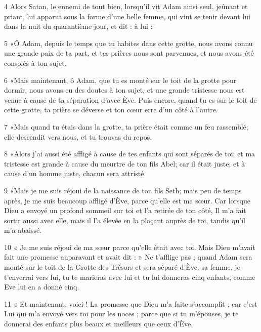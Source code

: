 \par 4 Alors Satan, le ennemi de tout bien, lorsqu'il vit Adam ainsi seul, jeûnant et priant, lui apparut sous la forme d'une belle femme, qui vint se tenir devant lui dans la nuit du quarantième jour, et dit : à lui :--

\par 5 «Ô Adam, depuis le temps que tu habites dans cette grotte, nous avons connu une grande paix de ta part, et tes prières nous sont parvenues, et nous avons été consolés à ton sujet.

\par 6 «Mais maintenant, ô Adam, que tu es monté sur le toit de la grotte pour dormir, nous avons eu des doutes à ton sujet, et une grande tristesse nous est venue à cause de ta séparation d'avec Ève. Puis encore, quand tu es sur le toit de cette grotte, ta prière se déverse et ton cœur erre d'un côté à l'autre.

\par 7 «Mais quand tu étais dans la grotte, ta prière était comme un feu rassemblé; elle descendit vers nous, et tu trouvas du repos.

\par 8 «Alors j'ai aussi été affligé à cause de tes enfants qui sont séparés de toi; et ma tristesse est grande à cause du meurtre de ton fils Abel; car il était juste; et à cause d'un homme juste, chacun sera attristé.

\par 9 «Mais je me suis réjoui de la naissance de ton fils Seth; mais peu de temps après, je me suis beaucoup affligé d'Ève, parce qu'elle est ma sœur. Car lorsque Dieu a envoyé un profond sommeil sur toi et l'a retirée de ton côté, Il m'a fait sortir aussi avec elle, mais il l'a élevée en la plaçant auprès de toi, tandis qu'il m'a abaissé.

\par 10 « Je me suis réjoui de ma sœur parce qu'elle était avec toi. Mais Dieu m'avait fait une promesse auparavant et avait dit : » Ne t'afflige pas ; quand Adam sera monté sur le toit de la Grotte des Trésors et sera séparé d'Ève. sa femme, je t'enverrai vers lui, tu te marieras avec lui et tu lui donneras cinq enfants, comme Eve lui en a donné cinq.

\par 11 « Et maintenant, voici ! La promesse que Dieu m'a faite s'accomplit ; car c'est Lui qui m'a envoyé vers toi pour les noces ; parce que si tu m'épouses, je te donnerai des enfants plus beaux et meilleurs que ceux d'Ève.


